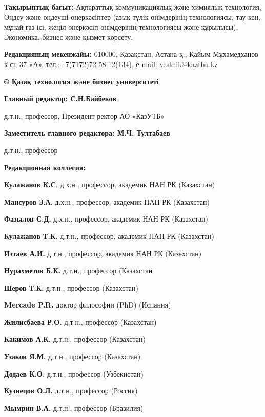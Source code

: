 \textbf{Тақырыптық бағыт:} Ақпараттық-коммуникациялық және химиялық
технология, Өңдеу және өңдеуші өнеркәсіптер (азық-түлік өнімдерінің
технологиясы, тау-кен, мұнай-газ ісі, жеңіл өнеркәсіп өнімдерінің
технологиясы және құрылысы), Экономика, бизнес және қызмет көрсету.

\textbf{Редакцияның мекенжайы:} 010000, Қазақстан, Астана қ., Қайым
Мұхамедханов к-сі, 37 «А», тел.:+7(7172)72-58-12(134), е-mail:
vestnik@kaztbu.kz

\begin{center}
\textbf{\large © Қазақ технология жəне бизнес университеті}
\end{center}

\pagebreak

\begin{center}
\textbf{Главный редактор: С.Н.Байбеков}

д.т.н., профессор, Президент-ректор АО «КазУТБ»

\textbf{Заместитель главного редактора: М.Ч. Тултабаев}

д.т.н., профессор

\textbf{Редакционная коллегия:}
\end{center}

\textbf{Кулажанов К.С}. д.х.н., профессор, академик НАН РК (Казахстан)

\textbf{Мансуров З.А}. д.х.н., профессор, академик НАН РК (Казахстан)

\textbf{Фазылов С.Д.} д.х.н., профессор, академик НАН РК (Казахстан)

\textbf{Кулажанов Т.К.} д.т.н., профессор, академик НАН РК (Казахстан)

\textbf{Изтаев А.И.} д.т.н., профессор, академик НАН РК (Казахстан)

\textbf{Нурахметов Б.К.} д.т.н., профессор (Казахстан

\textbf{Шеров Т.К.} д.т.н., профессор (Казахстан)

\textbf{Mercade P.R.} доктор философии (PhD) (Испания)

\textbf{Жилисбаева Р.О.} д.т.н., профессор (Казахстан)

\textbf{Какимов А.К.} д.т.н., профессор (Казахстан)

\textbf{Узаков Я.М.} д.т.н., профессор (Казахстан)

\textbf{Додаев К.О.} д.т.н., профессор (Узбекистан)

\textbf{Кузнецов О.Л.} д.т.н., профессор (Россия)

\textbf{Мымрин В.А.} д.т.н., профессор (Бразилия)

